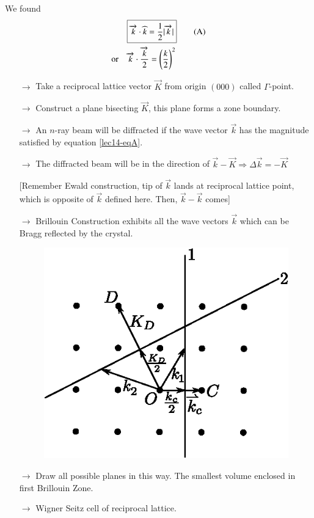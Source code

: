 We found
\begin{align*}
&\fbox{$\overrightarrow{k}\cdot \widehat{k}=\dfrac{1}{2}|\overrightarrow{k}|$}\tag{A}\label{lec14-eqA}\\
\text{or}\quad & \overrightarrow{k}\cdot \dfrac{\overrightarrow{k}}{2}=\left(\dfrac{k}{2}\right)^{2}
\end{align*}
\begin{itemize}
\item[$\to$] Take a reciprocal lattice vector $\overrightarrow{K}$ from origin $(000)$ called $\Gamma$-point.

\item[$\to$] Construct a plane bisecting $\overrightarrow{K}$, this plane forms a zone boundary.

\item[$\to$] An $n$-ray beam will be diffracted if the wave vector $\overrightarrow{k}$ has the magnitude satisfied by equation \eqref{lec14-eqA}.

\item[$\to$] The diffracted beam will be in the direction of $\overrightarrow{k}-\overrightarrow{K}\Rightarrow \Delta \overrightarrow{k}=-\overrightarrow{K}$

[Remember Ewald construction, tip of $\overrightarrow{k}$ lands at reciprocal lattice point, which is opposite of $\overrightarrow{k}$ defined here. Then, $\overrightarrow{k}-\overrightarrow{k}$ comes]

\item[$\to$] Brillouin Construction exhibits all the wave vectors $\overrightarrow{k}$ which can be Bragg reflected by the crystal.
\begin{figure}[H]
\centering
\includegraphics{images/lecture14/fig8.eps}
\end{figure}

\item[$\to$] Draw all possible planes in this way. The smallest volume enclosed in first Brillouin Zone.

\item[$\to$] Wigner Seitz cell of reciprocal lattice.
\end{itemize}

